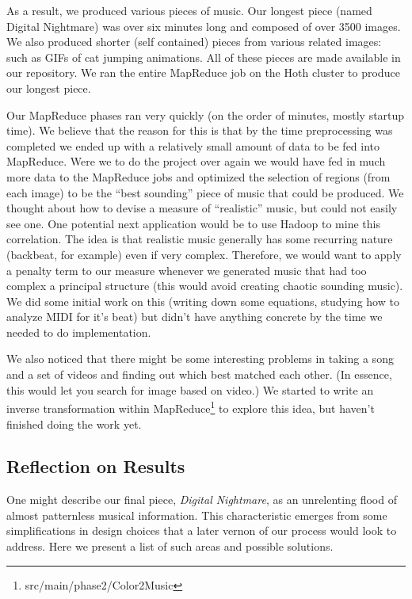 \documentclass[10pt, conference, compsocconf]{IEEEtran}
\newcommand{\code}[1]{\textsf{\small #1}}
\begin{document}
As a result, we produced various pieces of music.  Our longest piece
(named \code{Digital Nightmare}) was over six minutes long and
composed of over 3500 images.  We also produced shorter (self
contained) pieces from various related images: such as GIFs of cat
jumping animations.  All of these pieces are made available in our
repository.  We ran the entire MapReduce job on the Hoth cluster to
produce our longest piece.

Our MapReduce phases ran very quickly (on the order of minutes, mostly
startup time).  We believe that the reason for this is that by the
time preprocessing was completed we ended up with a relatively small
amount of data to be fed into MapReduce.  Were we to do the project
over again we would have fed in much more data to the MapReduce jobs
and optimized the selection of regions (from each image) to be the
``best sounding'' piece of music that could be produced.  We thought
about how to devise a measure of ``realistic'' music, but could not
easily see one.  One potential next application would be to use Hadoop
to mine this correlation.  The idea is that realistic music generally
has some recurring nature (backbeat, for example) even if very
complex.  Therefore, we would want to apply a penalty term to our
measure whenever we generated music that had too complex a principal
structure (this would avoid creating chaotic sounding music).  We did
some initial work on this (writing down some equations, studying how
to analyze MIDI for it's beat) but didn't have anything concrete by
the time we needed to do implementation.

We also noticed that there might be some interesting problems in
taking a song and a set of videos and finding out which best matched
each other.  (In essence, this would let you search for image based on
video.)  We started to write an inverse transformation within
MapReduce\footnote{src/main/phase2/Color2Music} to explore this idea,
but haven't finished doing the work yet.

\subsection{Reflection on Results}

One might describe our final piece, \emph{Digital Nightmare}, as an unrelenting flood of almost patternless musical information.
This characteristic emerges from some simplifications in design choices that a later vernon of our process would look to address.
Here we present a list of such areas and possible solutions.
\end{document}
